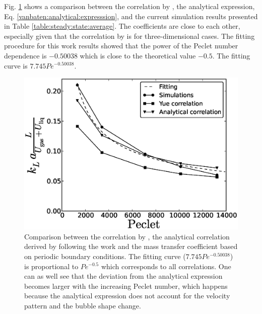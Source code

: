 \documentclass[preprint,12pt]{elsarticle}
\begin{document}
Fig. \ref{fig:volume:mass:coefficient} shows a comparison between the correlation by
\citet{yue-mass}, the analytical expression, Eq. \ref{vanbaten:analytical:expresssion}, and the current
simulation results presented in Table
\ref{table:steady:state:average}. The coefficients are close to each other, especially given that
the correlation by \citet{yue-mass} is for three-dimensional cases. The fitting procedure for this work results showed
that the power of
the Peclet number dependence  is $-0.50038$ which is close to the theoretical value $-0.5$.  The fitting curve is $7.745 Pe^{-0.50038}$.
\begin{figure}[htb!]
\includegraphics[width=\textwidth]{correlations_comparison.eps}
\caption{Comparison between the correlation by \citet{yue-mass}, the analytical correlation derived by following the work
\cite{irandoust} and the mass transfer coefficient based
on periodic boundary conditions. The fitting curve ($7.745 Pe^{-0.50038}$) is proportional to $Pe^{-0.5}$ which corresponds
to all correlations. One can as well see that the deviation from the analytical expression becomes
larger with the increasing Peclet number, which happens because the analytical expression does
 not account for the velocity pattern and the bubble shape change.\label{fig:volume:mass:coefficient}}
\end{figure}
\end{document}
